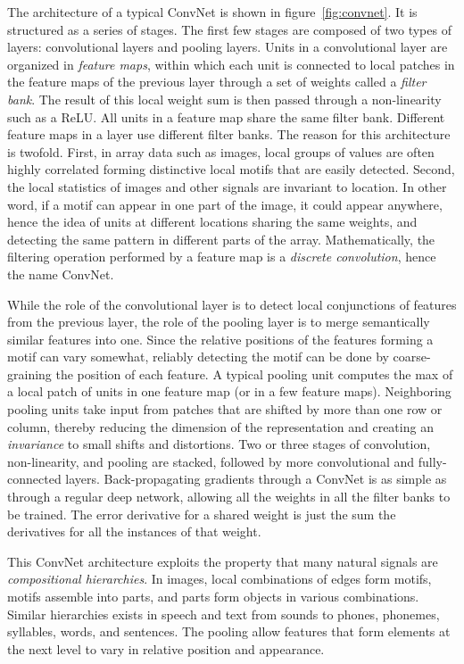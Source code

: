 \documentclass[10pts]{article}
\begin{document}
The architecture of a typical ConvNet is shown in
figure~\ref{fig:convnet}.  It is structured as a series of stages. The
first few stages are composed of two types of layers: convolutional
layers and pooling layers. Units in a convolutional layer are
organized in {\em feature maps}, within which each unit is connected
to local patches in the feature maps of the previous layer through a
set of weights called a {\em filter bank}. The result of this local
weight sum is then passed through a non-linearity such as a ReLU.  All
units in a feature map share the same filter bank. Different feature
maps in a layer use different filter banks. The reason for this
architecture is twofold. First, in array data such as images, local
groups of values are often highly correlated forming distinctive local
motifs that are easily detected. Second, the local statistics of
images and other signals are invariant to location. In other word, if
a motif can appear in one part of the image, it could appear anywhere,
hence the idea of units at different locations sharing the same
weights, and detecting the same pattern in different parts of the
array.  Mathematically, the filtering operation performed by a feature
map is a {\em discrete convolution}, hence the name ConvNet.

While the role of the convolutional layer is to detect local
conjunctions of features from the previous layer, the role of the
pooling layer is to merge semantically similar features into
one. Since the relative positions of the features forming a motif can
vary somewhat, reliably detecting the motif can be done by
coarse-graining the position of each feature. A typical pooling unit
computes the max of a local patch of units in one feature map (or in a
few feature maps). Neighboring pooling units take input from patches
that are shifted by more than one row or column, thereby reducing the
dimension of the representation and creating an {\em invariance} to
small shifts and distortions.  Two or three stages of convolution,
non-linearity, and pooling are stacked, followed by more convolutional
and fully-connected layers.  Back-propagating gradients through a
ConvNet is as simple as through a regular deep network, allowing all
the weights in all the filter banks to be trained. The error
derivative for a shared weight is just the sum the derivatives for all
the instances of that weight.

This ConvNet architecture exploits the property that many natural
signals are {\em compositional hierarchies}. In images, local
combinations of edges form motifs, motifs assemble into parts, and
parts form objects in various combinations.  Similar hierarchies
exists in speech and text from sounds to phones, phonemes, syllables,
words, and sentences. The pooling allow features that form elements at
the next level to vary in relative position and appearance. 
\end{document}
